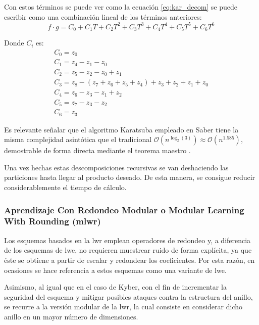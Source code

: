Con estos términos se puede ver como la ecuación \ref{eq:kar_decom} se puede escribir como una combinación lineal de los términos anteriores:
\begin{equation}
	f\cdot g= C_0+C_1 T+C_2 T^{2}+C_3 T^{3}+C_4 T^{4}+C_5 T^{5}+C_6 T^{6}
\end{equation}

Donde \(C_i\) es:
\begin{equation}
	\begin{array}{l}
		C_0=z_0\\
		C_1= z_4 - z_1 - z_0\\
		C_2=z_5 -z_2-z_0+z_1\\
		C_3=z_8 - \left(z_7+z_6+z_5+z_4\right)+z_3+z_2+z_1+z_0\\
		C_4=z_6 -z_3-z_1+z_2\\
		C_5= z_7 -z_3-z_2\\
		C_6=z_3
	\end{array}
\end{equation}

Es relevante señalar que el algoritmo Karatsuba empleado en Saber tiene la misma complejidad asintótica que el tradicional \(\mathcal{O}(n^{\log_2(3)})\approx\mathcal{O}(n^{1.585})\), demostrable de forma directa mediante el teorema maestro \cite{masterTh}. 
\newline

Una vez hechas estas descomposiciones recursivas se van deshaciendo las particiones hasta llegar al producto deseado. De esta manera, se consigue reducir considerablemente el tiempo de cálculo.
 
 \newpage
 
\subsubsection{Aprendizaje Con Redondeo Modular o Modular Learning With Rounding (\gls{mlwr})} 
Los esquemas basados en la \gls{lwr} \cite{modlwr} emplean operadores de redondeo y, a diferencia de los esquemas de \gls{lwe}, no requieren muestrear ruido de forma explícita, ya que éste se obtiene a partir de escalar y redondear los coeficientes. Por esta razón, en ocasiones se hace referencia a estos esquemas como una variante  de \gls{lwe}. 
\newline

Asimismo, al igual que en el caso de Kyber, con el fin de incrementar la seguridad del esquema y mitigar posibles ataques contra la estructura del anillo, se recurre a la versión modular de la \gls{lwr}, la cual consiste en considerar dicho anillo en un mayor número de dimensiones. 
\newline


